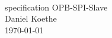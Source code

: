 \begin{titlepage}
   \mbox{}\vspace{5\baselineskip}\\
   \sffamily\huge
   \centering
   specification OPB-SPI-Slave
   \vspace{2\baselineskip}\\
   \rmfamily\Large
   Daniel Koethe
   \vspace{1\baselineskip}\\
   \today
\end{titlepage}


